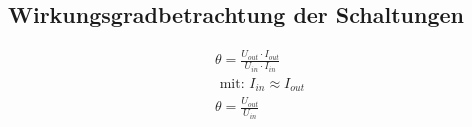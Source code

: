 \subsection{Wirkungsgradbetrachtung der Schaltungen}
\begin{align}
    \theta = \frac{U_{out}\cdot I_{out}}{U_{in}\cdot I_{in}} \\
    \text{ mit: } I_{in} \approx I_{out} \\
    \theta = \frac{U_{out}}{U_{in}}
\end{align}